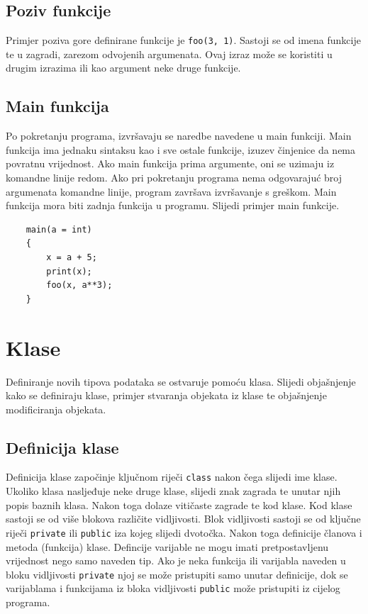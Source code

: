 \documentclass[times, utf8, zavrsni]{fer}
\begin{document}
\subsection{Poziv funkcije}
Primjer poziva gore definirane funkcije je \verb|foo(3, 1)|. Sastoji se od imena funkcije te u zagradi, zarezom odvojenih argumenata. Ovaj izraz može se koristiti u 
drugim izrazima ili kao argument neke druge funkcije.

\subsection{Main funkcija}
Po pokretanju programa, izvršavaju se naredbe navedene u main funkciji. Main funkcija ima jednaku sintaksu kao i sve ostale funkcije, 
izuzev činjenice da nema povratnu vrijednost. Ako main funkcija prima argumente, oni se uzimaju iz komandne linije redom. Ako pri pokretanju programa nema
odgovarajuć broj argumenata komandne linije, program završava izvršavanje s greškom. Main funkcija mora biti zadnja funkcija u programu. Slijedi primjer main funkcije.
\begin{verbatim}
    main(a = int)
    {
        x = a + 5;
        print(x);
        foo(x, a**3);
    }
\end{verbatim}

\section{Klase}
Definiranje novih tipova podataka se ostvaruje pomoću klasa. Slijedi objašnjenje kako se definiraju klase, primjer stvaranja objekata iz klase 
te objašnjenje modificiranja objekata.

\subsection{Definicija klase}
Definicija klase započinje ključnom riječi \verb|class| nakon čega slijedi ime klase. Ukoliko klasa nasljeđuje neke druge klase, slijedi znak zagrada te unutar
njih popis baznih klasa. Nakon toga dolaze vitičaste zagrade te kod klase. Kod klase sastoji se od više blokova različite vidljivosti. Blok vidljivosti
sastoji se od ključne riječi \verb|private| ili \verb|public| iza kojeg slijedi dvotočka. Nakon toga definicije članova i metoda (funkcija) klase.
Defincije varijable ne mogu imati pretpostavljenu vrijednost nego samo naveden tip. Ako je neka funkcija ili varijabla naveden u bloku vidljivosti \verb|private|
njoj se može pristupiti samo unutar definicije, dok se varijablama i funkcijama iz bloka vidljivosti \verb|public| može pristupiti iz cijelog programa.
\end{document}
